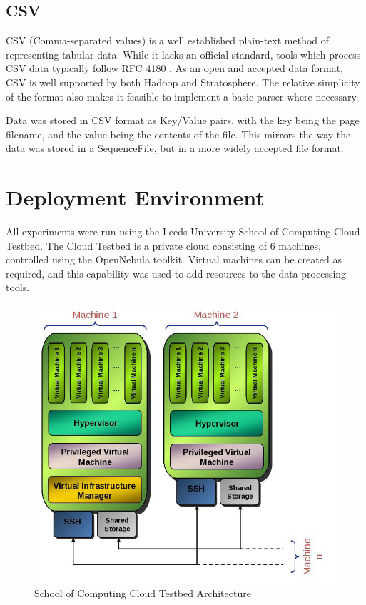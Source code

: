 \subsection{CSV}
CSV (Comma-separated values) is a well established plain-text method of representing tabular data. While it lacks an official standard, tools which process CSV data typically follow RFC 4180 \cite{rfc4180}. As an open and accepted data format, CSV is well supported by both Hadoop and Stratosphere. The relative simplicity of the format also makes it feasible to implement a basic parser where necessary. 

Data was stored in CSV format as Key/Value pairs, with the key being the page filename, and the value being the contents of the file. This mirrors the way the data was stored in a SequenceFile, but in a more widely accepted file format. 

\section{Deployment Environment}
All experiments were run using the Leeds University School of Computing Cloud Testbed. The Cloud Testbed is a private cloud consisting of 6 machines, controlled using the OpenNebula toolkit. Virtual machines can be created as required, and this capability was used to add resources to the data processing tools. 

\begin{figure}[H]
\centering
\includegraphics[scale=0.3]{resources/CloudTestBed.png}
\caption{School of Computing Cloud Testbed Architecture}
\end{figure}


